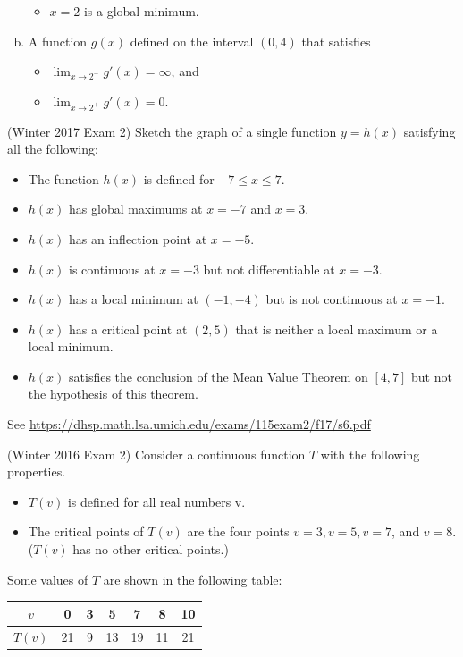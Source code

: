 \documentclass[11pt]{exam}
\begin{document}
\begin{questions}
\begin{enumerate}[(a)]
\begin{itemize}
	\item $x=2$ is a global minimum.
	\end{itemize}
	\item A function $g(x)$ defined on the interval $(0,4)$ that satisfies 
	\begin{itemize}
	\item $\displaystyle\lim_{x \rightarrow 2^-} g'(x) = \infty$, and
	\item $\displaystyle\lim_{x \rightarrow 2^+} g'(x) = 0$.
	\end{itemize}
	\end{enumerate}
      \question (Winter 2017 Exam 2) %
        Sketch the graph of a single function $y = h(x)$ satisfying all the following:
\begin{itemize}
\item The function $h(x)$ is defined for $-7 \leqslant x \leqslant 7$.
\item $h(x)$ has global maximums at $x=-7$ and $x=3$.
\item $h(x)$ has an inflection point at $x = -5$.
\item $h(x)$ is continuous at $x = -3$ but not differentiable at $x = -3$.
\item $h(x)$ has a local minimum at $(-1, -4)$ but is not continuous at $x = -1$.
\item $h(x)$ has a critical point at $(2, 5)$ that is neither a local maximum or a local minimum.
\item $h(x)$ satisfies the conclusion of the Mean Value Theorem on $[4,7]$ but not the hypothesis of this theorem.
\end{itemize}
\begin{solution}
  See \href{https://dhsp.math.lsa.umich.edu/exams/115exam2/f17/s6.pdf}{https://dhsp.math.lsa.umich.edu/exams/115exam2/f17/s6.pdf}
\end{solution}
\question (Winter 2016 Exam 2) %
  Consider a continuous function \(T\) with the following properties.
  \begin{itemize}
  \item \(T(v)\) is defined for all real numbers v.
  \item The critical points
    of \(T(v)\) are the four points \(v = 3, v = 5, v = 7\), and \(v = 8\). (\(T(v)\)
    has no other critical points.)
  \end{itemize}
  Some values of \(T\) are shown in the following table:\\
  \begin{tabular}{|c|c|c|c|c|c|c|}
    \hline
    \(v\)&0&3&5&7&8&10\\
    \hline
    \(T(v)\)&21&9&13&19&11&21\\
    \hline
  \end{tabular}


\end{questions}
\end{document}
